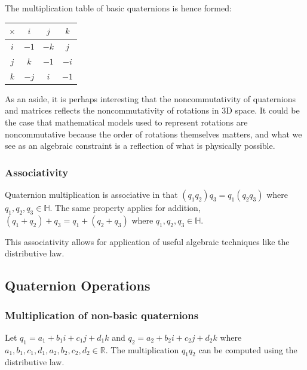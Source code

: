 \documentclass[12pt, a4paper]{article}
\begin{document}
The multiplication table of basic quaternions is hence formed:

\begin{center}
    \doublespacing
    \begin{tabular}{ | c | c | c | c | }
        \hline
        $\times$ & $i$  & $j$  & $k$  \\
        \hline
        $i$      & $-1$ & $-k$ & $j$  \\
        \hline
        $j$      & $k$  & $-1$ & $-i$ \\
        \hline
        $k$      & $-j$ & $i$  & $-1$ \\
        \hline
    \end{tabular}
    \label{sophisticatedtable}
\end{center}

As an aside, it is perhaps interesting that the noncommutativity of quaternions
and matrices reflects the noncommutativity of rotations in 3D space. It could be
the case that mathematical models used to represent rotations are noncommutative
because the order of rotations themselves matters, and what we see as an
algebraic constraint is a reflection of what is physically possible. \\  

\subsubsection{Associativity}
Quaternion multiplication is associative in that $(q_1 q_2) q_3 = q_1 (q_2 q_3)$
where $q_1,q_2,q_3 \in \mathbb{H}$.
The same property applies for addition, $(q_1 + q_2) + q_3 = q_1 + (q_2 + q_3)$
where $q_1,q_2,q_3 \in \mathbb{H}$.

This associativity allows for application of useful algebraic
techniques like the distributive law.

\subsection{Quaternion Operations}
\subsubsection{Multiplication of non-basic quaternions}
Let $q_1 = a_1 + b_1i + c_1j + d_1k$ and $q_2 = a_2 + b_2i + c_2j + d_2k$ where
$a_1, b_1, c_1, d_1, a_2, b_2, c_2, d_2 \in \mathbb{R}$. The multiplication
$q_1q_2$ can be computed using the distributive law.
\end{document}
